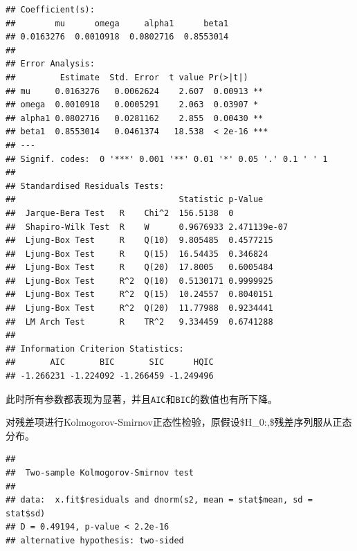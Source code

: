\documentclass[
]{article}
\newenvironment{Shaded}{\begin{snugshade}}{\end{snugshade}}
\newcommand{\DataTypeTok}[1]{\textcolor[rgb]{0.13,0.29,0.53}{#1}}
\newcommand{\KeywordTok}[1]{\textcolor[rgb]{0.13,0.29,0.53}{\textbf{#1}}}
\newcommand{\NormalTok}[1]{#1}
\newcommand{\OperatorTok}[1]{\textcolor[rgb]{0.81,0.36,0.00}{\textbf{#1}}}
\newcommand{\OtherTok}[1]{\textcolor[rgb]{0.56,0.35,0.01}{#1}}
\newcommand{\StringTok}[1]{\textcolor[rgb]{0.31,0.60,0.02}{#1}}
\begin{document}
\begin{verbatim}
## Coefficient(s):
##        mu      omega     alpha1      beta1  
## 0.0163276  0.0010918  0.0802716  0.8553014  
## 
## Error Analysis:
##         Estimate  Std. Error  t value Pr(>|t|)    
## mu     0.0163276   0.0062624    2.607  0.00913 ** 
## omega  0.0010918   0.0005291    2.063  0.03907 *  
## alpha1 0.0802716   0.0281162    2.855  0.00430 ** 
## beta1  0.8553014   0.0461374   18.538  < 2e-16 ***
## ---
## Signif. codes:  0 '***' 0.001 '**' 0.01 '*' 0.05 '.' 0.1 ' ' 1
## 
## Standardised Residuals Tests:
##                                 Statistic p-Value     
##  Jarque-Bera Test   R    Chi^2  156.5138  0           
##  Shapiro-Wilk Test  R    W      0.9676933 2.471139e-07
##  Ljung-Box Test     R    Q(10)  9.805485  0.4577215   
##  Ljung-Box Test     R    Q(15)  16.54435  0.346824    
##  Ljung-Box Test     R    Q(20)  17.8005   0.6005484   
##  Ljung-Box Test     R^2  Q(10)  0.5130171 0.9999925   
##  Ljung-Box Test     R^2  Q(15)  10.24557  0.8040151   
##  Ljung-Box Test     R^2  Q(20)  11.77988  0.9234441   
##  LM Arch Test       R    TR^2   9.334459  0.6741288   
## 
## Information Criterion Statistics:
##       AIC       BIC       SIC      HQIC 
## -1.266231 -1.224092 -1.266459 -1.249496
\end{verbatim}

此时所有参数都表现为显著，并且\texttt{AIC}和\texttt{BIC}的数值也有所下降。

对残差项进行Kolmogorov-Smirnov正态性检验，原假设\$H\_0:,\$残差序列服从正态分布。

\begin{Shaded}
\end{Shaded}

\begin{verbatim}
## 
##  Two-sample Kolmogorov-Smirnov test
## 
## data:  x.fit$residuals and dnorm(s2, mean = stat$mean, sd = stat$sd)
## D = 0.49194, p-value < 2.2e-16
## alternative hypothesis: two-sided
\end{verbatim}
\end{document}
